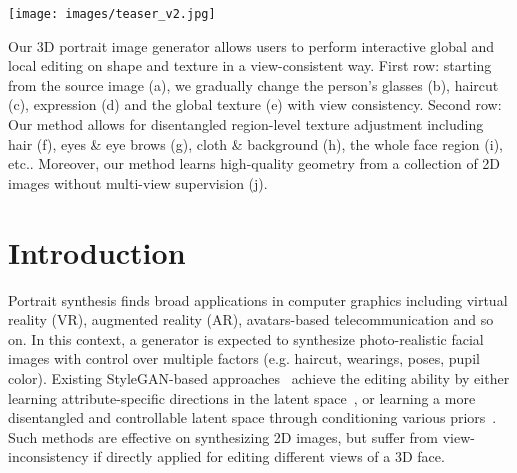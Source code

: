 \documentclass[acmtog]{acmart}
\begin{document}


\begin{teaserfigure}
\centering
  \texttt{[image: images/teaser\_v2.jpg]}
  \caption{Our 3D portrait image generator allows users to perform interactive global and local editing on shape and texture in a view-consistent way. First row: starting from the source image (a), we gradually change the person's glasses (b), haircut (c), expression (d) and the global texture (e) with view consistency. Second row: Our method allows for disentangled region-level texture adjustment including hair (f), eyes \& eye brows (g), cloth \& background (h), the whole face region (i), etc.. Moreover, our method learns high-quality geometry from a collection of 2D images without multi-view supervision (j).}
  \label{fig:teaser}
\end{teaserfigure}

\maketitle

\section{Introduction}






Portrait synthesis finds broad applications in computer graphics including virtual reality (VR), augmented reality (AR), avatars-based telecommunication and so on. In this context, a generator is expected to synthesize photo-realistic facial images with control over multiple factors (e.g. haircut, wearings, poses, pupil color). Existing StyleGAN-based approaches~\cite{abdal2021styleflow, shen2020interfacegan, chen2016infogan, tewari2020stylerig} achieve the editing ability by either learning attribute-specific directions in the latent space~\cite{abdal2021styleflow, shen2020interfacegan, chen2016infogan, tewari2020stylerig}, or learning a more disentangled and controllable latent space through conditioning various priors~\cite{zhu2020sean, wang2018high, park2019semantic, chen2020sofgan, shi2021semanticstylegan, chen2020deepfacedrawing, chen2021deepfaceediting, li2020deepfacepencil, tewari2020stylerig, deng2020disentangled, wang2021cross}. Such methods are effective on synthesizing 2D images, but suffer from view-inconsistency if directly applied for editing different views of a 3D face.
\end{document}

